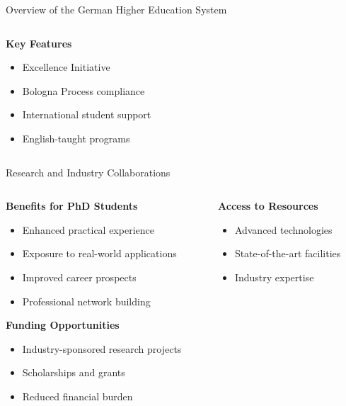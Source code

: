 \documentclass[10pt]{beamer}
\begin{document}
\begin{frame}[fragile]{Overview of the German Higher Education System}
\begin{columns}[T]
\begin{column}{0.5\textwidth}
            \vspace{0.5cm}
            
            \textbf{Key Features}
            \begin{itemize}
                \item Excellence Initiative
                \item Bologna Process compliance
                \item International student support
                \item English-taught programs
            \end{itemize}
        \end{column}
    \end{columns}
\end{frame}

\begin{frame}[fragile]{Research and Industry Collaborations}
    \begin{columns}[T]
        \begin{column}{0.5\textwidth}
            \textbf{Benefits for PhD Students}
            \begin{itemize}
                \item Enhanced practical experience
                \item Exposure to real-world applications
                \item Improved career prospects
                \item Professional network building
            \end{itemize}
            
            \vspace{0.5cm}
            
            \textbf{Funding Opportunities}
            \begin{itemize}
                \item Industry-sponsored research projects
                \item Scholarships and grants
                \item Reduced financial burden
            \end{itemize}
        \end{column}
        
        \begin{column}{0.5\textwidth}
            \textbf{Access to Resources}
            \begin{itemize}
                \item Advanced technologies
                \item State-of-the-art facilities
                \item Industry expertise
            \end{itemize}
            

\end{column}
\end{columns}
\end{frame}
\end{document}
